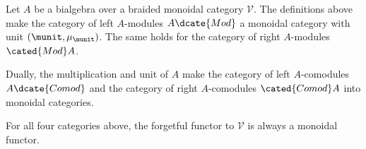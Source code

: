 \begin{proposition}\label{prop:bialgebra-Mod-monoidal}
	Let $A$ be a bialgebra over a braided monoidal category $\mathcal{V}$. The
	definitions above make the category of left $A$-modules $A\dcate{Mod}$ a
	monoidal category with unit $(\munit,\mu_{\munit})$. The same holds for the
	category of right $A$-modules $\cated{Mod}A$.

	Dually, the multiplication and unit of $A$ make the category of left
	$A$-comodules $A\dcate{Comod}$ and the category of right $A$-comodules
	$\cated{Comod}A$ into monoidal categories.

	For all four categories above, the forgetful functor to $\mathcal{V}$ is
	always a monoidal functor.
\end{proposition}
